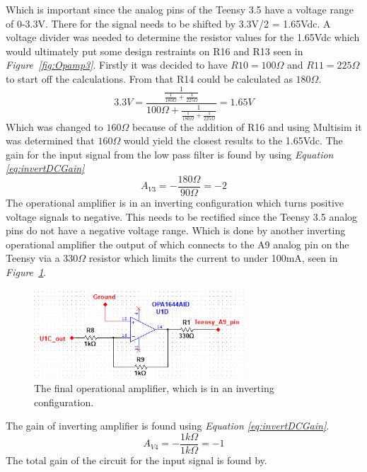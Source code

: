 Which is important since the analog pins of the Teensy 3.5 have a voltage range of 0-3.3V.
There for the signal needs to be shifted by 3.3V/2 = 1.65Vdc.
A voltage divider was needed to determine the resistor values for the 1.65Vdc which would ultimately put some design restraints on R16 and R13 seen in \textit{Figure~\ref{fig:Opamp3}}.
Firstly it was decided to have $R10 = 100\Omega$  and $R11 = 225\Omega$ to start off the calculations.
From that R14 could be calculated as $180\Omega$.
$$3.3V = \frac{\frac{1}{\frac{1}{180\Omega}+\frac{1}{225\Omega}}}{100\Omega+\frac{1}{\frac{1}{180\Omega}+\frac{1}{225\Omega}}} = 1.65V$$
Which was changed to $160\Omega$ because of the addition of R16 and using Multisim it was determined that $160\Omega$ would yield the closest results to the 1.65Vdc.
The gain for the input signal from the low pass filter is found by using \textit{Equation \ref{eq:invertDCGain}}
$$A_{V3} = -\frac{180\Omega}{90\Omega} = -2$$
The operational amplifier is in an inverting configuration which turns positive voltage signals to negative.
This needs to be rectified since the Teensy 3.5 analog pins do not have a negative voltage range.
Which is done by another inverting operational amplifier the output of which connects to the A9 analog pin on the Teensy via a 330$\Omega$ resistor which limits the current to under 100mA, seen in \textit{Figure~\ref{fig:Opamp4}}.

\begin{figure}[h]
    \centering
    \includegraphics[width=0.70\textwidth]{graphics/OPamp4.png}
    \caption{The final operational amplifier, which is in an inverting configuration.}
    \label{fig:Opamp4}
\end{figure}

\noindent The gain of inverting amplifier is found using \textit{Equation \ref{eq:invertDCGain}}.
$$ A_{V4} = -\frac{1k \Omega}{1k \Omega} = -1$$
The total gain of the circuit for the input signal is found by.


